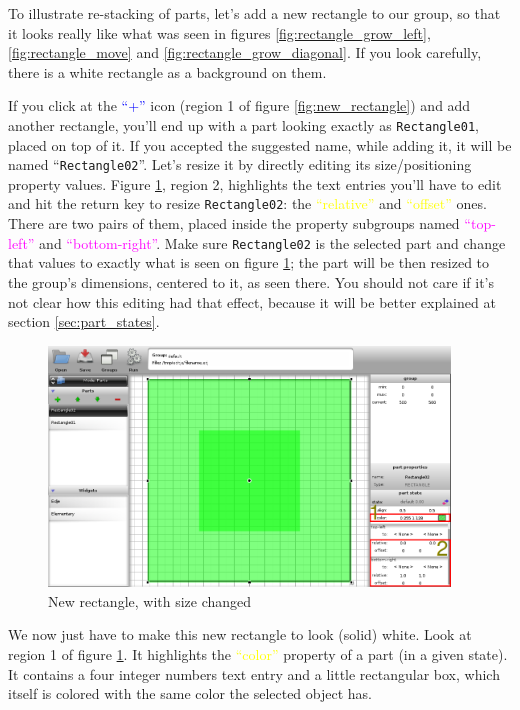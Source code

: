 \documentclass[a4paper]{profusion}
\newcommand{\GUIIcon}[1]{\textcolor{blue}{#1}}    %
\newcommand{\GUILabel}[1]{\textcolor{magenta}{#1}}
\newcommand{\GUIEditable}[1]{\textcolor{yellow}{#1}} %
\begin{document}
To illustrate re-stacking of parts, let's add a new rectangle to our
group, so that it looks really like what was seen in figures
\ref{fig:rectangle_grow_left}, \ref{fig:rectangle_move} and
\ref{fig:rectangle_grow_diagonal}. If you look carefully, there is a
white rectangle as a background on them.

If you click at the \GUIIcon{``+''} icon (region 1 of figure
\ref{fig:new_rectangle}) and add another rectangle, you'll end up with
a part looking exactly as \texttt{Rectangle01}, placed on top of
it. If you accepted the suggested name, while adding it, it will be
named ``\texttt{Rectangle02}''. Let's resize it by directly editing
its size/positioning property values. Figure
\ref{fig:restack_pre_pre}, region 2, highlights the text entries
you'll have to edit and hit the return key to resize
\texttt{Rectangle02}: the \GUIEditable{``relative''} and
\GUIEditable{``offset''} ones. There are two pairs of them, placed
inside the property subgroups named \GUILabel{``top-left''} and
\GUILabel{``bottom-right''}. Make sure \texttt{Rectangle02} is the
selected part and change that values to exactly what is seen on figure
\ref{fig:restack_pre_pre}; the part will be then resized to the
group's dimensions, centered to it, as seen there. You should not care
if it's not clear how this editing had that effect, because it will be
better explained at section \ref{sec:part_states}.

\begin{figure}[h!]
  \centering
  \includegraphics[width=0.95\textwidth]{images/part_resize_entries.png}
  \caption{New rectangle, with size changed}
  \label{fig:restack_pre_pre}
\end{figure}

We now just have to make this new rectangle to look (solid) white.
Look at region 1 of figure \ref{fig:restack_pre_pre}. It highlights
the \GUIEditable{``color''} property of a part (in a given state). It
contains a four integer numbers text entry and a little rectangular
box, which itself is colored with the same color the selected object
has.
\end{document}
